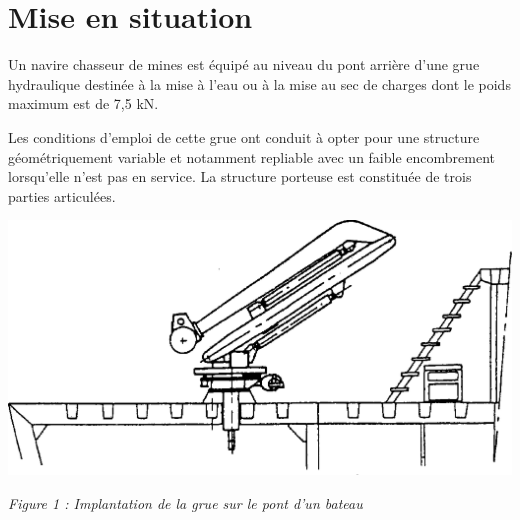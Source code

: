 \documentclass[10pt,fleqn]{article} %
\begin{document}

\vspace{10cm}
\pagestyle{fancy}
\thispagestyle{plain}


\def\columnseprulecolor{\color{ocre}}
\setlength{\columnseprule}{0.4pt} 

\section{Mise en situation}

\ifprof
\else
\begin{minipage}[c]{.49\linewidth}
Un navire chasseur de mines est équipé au niveau du pont arrière d'une grue hydraulique destinée à la mise à l'eau ou à la mise au sec de charges dont le poids maximum est de 7,5 kN.

Les conditions d'emploi de cette grue ont conduit à opter pour une structure géométriquement variable et notamment repliable avec un faible encombrement lorsqu'elle n'est pas en service. La structure porteuse est constituée de trois parties articulées. 
\end{minipage} \hfill
\begin{minipage}[c]{.49\linewidth}
\begin{center}
\includegraphics[width=.95\textwidth]{images/Grue}

\textit{Figure 1 : Implantation de la grue sur le pont d'un bateau}
\end{center}
\end{minipage} 

\vspace{.25cm}
\end{document}
